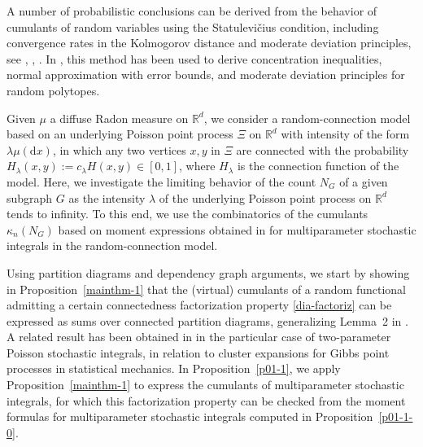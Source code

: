 \documentclass[bj,authoryear,noshowframe]{imsart}
\theoremstyle{plain}
\theoremstyle{remark}
\newcommand{\R}{\mathbb{R}}
\begin{document}

 A number of probabilistic conclusions can be derived
 from the behavior of cumulants of random variables using the 
Statulevi\v{c}ius condition, 
 including convergence rates in the Kolmogorov distance
 and moderate deviation principles, see
 \cite{saulis},
 \cite{doring},
 \cite{doering}. 
 In \cite{grotethale18,thale18}, this method has been used to 
 derive concentration inequalities,
 normal approximation with error bounds,
 and moderate deviation principles for random polytopes.
 
 
Given $\mu$ a %
diffuse Radon measure on $\R^d$,
 we consider a random-connection model
 based on an underlying Poisson point process $\Xi$ on $\R^d$
 with intensity of the form $\lambda\mu(\mathrm{d}x)$, in which 
 any two vertices $x,y$ in $\Xi$ are connected
 with the probability $H_\lambda(x,y):= c_\lambda H(x,y) \in [0,1]$,
 where $H_\lambda$ is the connection function of the model. 
 Here, we investigate the limiting behavior
 of the count $N_G$ of a given subgraph $G$
 as the intensity $\lambda$ of the underlying Poisson point process on $\R^d$
 tends to infinity. 
 To this end, we use the combinatorics of the cumulants $\kappa_n(N_G)$ 
 based on moment expressions obtained in \cite{prkhp} for
 multiparameter stochastic integrals in the random-connection model.
 

Using partition diagrams and dependency graph arguments,
we start by showing in Proposition~\ref{mainthm-1}
that the (virtual) cumulants of a random functional admitting
a certain connectedness factorization property \eqref{dia-factoriz}  
can be expressed as sums over connected partition diagrams, 
 generalizing Lemma~2 in \cite{MalyshevMinlos91}.  
 A related result has been obtained in \cite{jansen}
 in the particular case of two-parameter Poisson stochastic
 integrals, in relation to 
 cluster expansions for Gibbs point processes in statistical
 mechanics. 
 In Proposition~\ref{p01-1}, we apply Proposition~\ref{mainthm-1} 
 to express the cumulants of multiparameter stochastic integrals,
 for which this factorization property can be checked from 
 the moment formulas for 
 multiparameter stochastic integrals computed in Proposition~\ref{p01-1-0}. 
 
\end{document}
